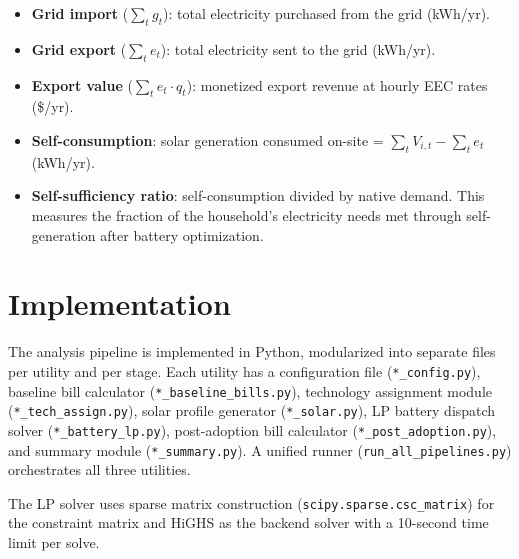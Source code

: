 \documentclass[11pt]{article}
\begin{document}
\begin{itemize}
\item \textbf{Grid import} ($\sum_t g_t$): total electricity purchased from the grid (kWh/yr).
\item \textbf{Grid export} ($\sum_t e_t$): total electricity sent to the grid (kWh/yr).
\item \textbf{Export value} ($\sum_t e_t \cdot q_t$): monetized export revenue at hourly EEC rates (\$/yr).
\item \textbf{Self-consumption}: solar generation consumed on-site = $\sum_t V_{i,t} - \sum_t e_t$ (kWh/yr).
\item \textbf{Self-sufficiency ratio}: self-consumption divided by native demand. This measures the fraction of the household's electricity needs met through self-generation after battery optimization.
\end{itemize}

\section{Implementation}
\label{sec:implementation}

The analysis pipeline is implemented in Python, modularized into separate files per utility and per stage. Each utility has a configuration file (\texttt{*\_config.py}), baseline bill calculator (\texttt{*\_baseline\_bills.py}), technology assignment module (\texttt{*\_tech\_assign.py}), solar profile generator (\texttt{*\_solar.py}), LP battery dispatch solver (\texttt{*\_battery\_lp.py}), post-adoption bill calculator (\texttt{*\_post\_adoption.py}), and summary module (\texttt{*\_summary.py}). A unified runner (\texttt{run\_all\_pipelines.py}) orchestrates all three utilities.

The LP solver uses sparse matrix construction (\texttt{scipy.sparse.csc\_matrix}) for the constraint matrix and HiGHS as the backend solver with a 10-second time limit per solve.



\end{document}
